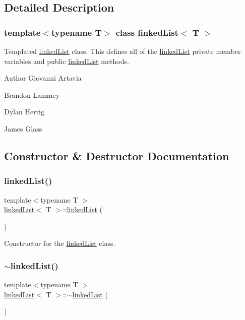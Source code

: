 \subsection{Detailed Description}
\subsubsection*{template$<$typename T$>$\newline
class linked\+List$<$ T $>$}

Templated \hyperlink{classlinked_list}{linked\+List} class. This defines all of the \hyperlink{classlinked_list}{linked\+List} private member variables and public \hyperlink{classlinked_list}{linked\+List} methods. \begin{DoxyAuthor}{Author}
Giovanni Artavia 

Brandon Lammey 

Dylan Herrig 

James Glass 
\end{DoxyAuthor}


\subsection{Constructor \& Destructor Documentation}
\mbox{\label{classlinked_list_a63f463149258669636253a7977157c9c}} 
\subsubsection{\texorpdfstring{linked\+List()}{linkedList()}}
{\footnotesize\ttfamily template$<$typename T $>$ \\
\hyperlink{classlinked_list}{linked\+List}$<$ T $>$\+::\hyperlink{classlinked_list}{linked\+List} (\begin{DoxyParamCaption}{ }\end{DoxyParamCaption})}

Constructor for the \hyperlink{classlinked_list}{linked\+List} class. \mbox{\label{classlinked_list_ab1a1db35879ca07c40b68ccb2b05d150}} 
\subsubsection{\texorpdfstring{$\sim$linked\+List()}{~linkedList()}}
{\footnotesize\ttfamily template$<$typename T $>$ \\
\hyperlink{classlinked_list}{linked\+List}$<$ T $>$\+::$\sim$\hyperlink{classlinked_list}{linked\+List} (\begin{DoxyParamCaption}{ }\end{DoxyParamCaption})}

